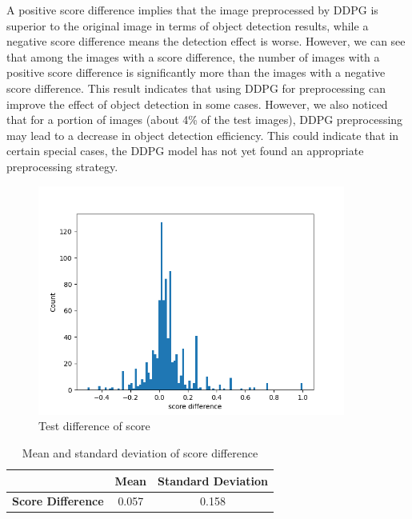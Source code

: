 \documentclass{PHlab-thesis}
\begin{document}
A positive score difference implies that the image preprocessed by DDPG is superior to the original image in terms of object detection results, while a negative score difference means the detection effect is worse. However, we can see that among the images with a score difference, the number of images with a positive score difference is significantly more than the images with a negative score difference. This result indicates that using DDPG for preprocessing can improve the effect of object detection in some cases. However, we also noticed that for a portion of images (about 4\% of the test images), DDPG preprocessing may lead to a decrease in object detection efficiency. This could indicate that in certain special cases, the DDPG model has not yet found an appropriate preprocessing strategy.

\begin{figure}[!htb] 
    \centering 
    \includegraphics[width=0.9\textwidth]{images/test difference of score.png}
    \caption{Test difference of score} 
    \label{Fig./Test difference of score} 
\end{figure}

\begin{table}[H]
    \centering
    \label{table:mean_and_std} 
    \begin{tabular}{c c c}
        \toprule
        & \textbf{Mean} & \textbf{Standard Deviation} \\
        \midrule
        \textbf{Score Difference} & 0.057 & 0.158 \\
        \bottomrule
    \end{tabular}
    \caption{Mean and standard deviation of score difference}
\end{table}
\end{document}
